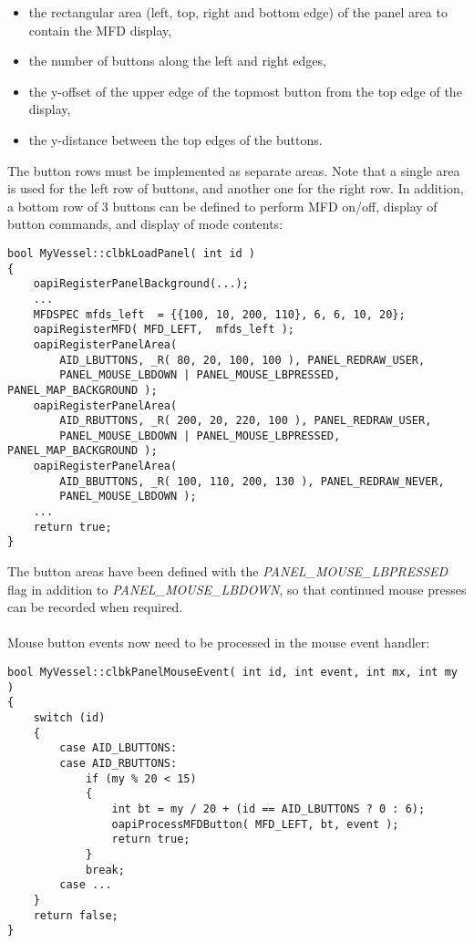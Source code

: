 \documentclass[Orbiter Developer Manual.tex]{subfiles}
\begin{document}
\begin{itemize}
\item the rectangular area (left, top, right and bottom edge) of the panel area to contain the MFD display,
\item the number of buttons along the left and right edges,
\item the y-offset of the upper edge of the topmost button from the top edge of the display,
\item the y-distance between the top edges of the buttons.
\end{itemize}

\noindent
The button rows must be implemented as separate areas. Note that a single area is used for the left row of buttons, and another one for the right row. In addition, a bottom row of 3 buttons can be defined to perform MFD on/off, display of button commands, and display of mode contents:

\begin{lstlisting}
bool MyVessel::clbkLoadPanel( int id )
{
	oapiRegisterPanelBackground(...);
	...
	MFDSPEC mfds_left  = {{100, 10, 200, 110}, 6, 6, 10, 20};
	oapiRegisterMFD( MFD_LEFT,  mfds_left );
	oapiRegisterPanelArea(
		AID_LBUTTONS, _R( 80, 20, 100, 100 ), PANEL_REDRAW_USER,
		PANEL_MOUSE_LBDOWN | PANEL_MOUSE_LBPRESSED, PANEL_MAP_BACKGROUND );
	oapiRegisterPanelArea(
		AID_RBUTTONS, _R( 200, 20, 220, 100 ), PANEL_REDRAW_USER,
		PANEL_MOUSE_LBDOWN | PANEL_MOUSE_LBPRESSED, PANEL_MAP_BACKGROUND );
	oapiRegisterPanelArea(
		AID_BBUTTONS, _R( 100, 110, 200, 130 ), PANEL_REDRAW_NEVER,
		PANEL_MOUSE_LBDOWN );
	...
	return true;
}
\end{lstlisting}

\noindent
The button areas have been defined with the \textit{PANEL\_MOUSE\_LBPRESSED} flag in addition to \textit{PANEL\_MOUSE\_LBDOWN}, so that continued mouse presses can be recorded when required.\\
\\
Mouse button events now need to be processed in the mouse event handler:

\begin{lstlisting}
bool MyVessel::clbkPanelMouseEvent( int id, int event, int mx, int my )
{
	switch (id)
	{
		case AID_LBUTTONS:
		case AID_RBUTTONS:
			if (my % 20 < 15)
			{
				int bt = my / 20 + (id == AID_LBUTTONS ? 0 : 6);
				oapiProcessMFDButton( MFD_LEFT, bt, event );
				return true;
			}
			break;
		case ...
	}
	return false;
}
\end{lstlisting}
\end{document}
